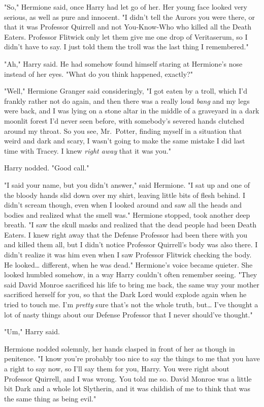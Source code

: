 "So," Hermione said, once Harry had let go of her. Her young face looked very
serious, as well as pure and innocent. "I didn't tell the Aurors you were
there, or that it was Professor Quirrell and not You-Know-Who who killed all
the Death Eaters. Professor Flitwick only let them give me one drop of
Veritaserum, so I didn't have to say. I just told them the troll was the last
thing I remembered."

"Ah," Harry said. He had somehow found himself staring at Hermione's nose
instead of her eyes. "What do you think happened, exactly?"

"Well," Hermione Granger said consideringly, "I got eaten by a troll, which I'd
frankly rather not do again, and then there was a really loud \emph{bang} and
my legs were back, and I was lying on a stone altar in the middle of a
graveyard in a dark moonlit forest I'd never seen before, with somebody's
severed hands clutched around my throat. So you see, Mr.~Potter, finding myself
in a situation that weird and dark and scary, I wasn't going to make the same
mistake I did last time with Tracey. I knew \emph{right away} that it was you."

Harry nodded. "Good call."

"I said your name, but you didn't answer," said Hermione. "I sat up and one of
the bloody hands slid down over my shirt, leaving little bits of flesh behind.
I didn't scream though, even when I looked around and saw all the heads and
bodies and realized what the smell was." Hermione stopped, took another deep
breath. "I saw the skull masks and realized that the dead people had been Death
Eaters. I knew right away that the Defense Professor had been there with you
and killed them all, but I didn't notice Professor Quirrell's body was also
there. I didn't realize it was him even when I saw Professor Flitwick checking
the body. He looked{\ldots} different, when he was dead." Hermione's voice
became quieter. She looked humbled somehow, in a way Harry couldn't often
remember seeing. "They said David Monroe sacrificed his life to bring me back,
the same way your mother sacrificed herself for you, so that the Dark Lord
would explode again when he tried to touch me. I'm \emph{pretty} sure that's
not the whole truth, but{\ldots} I've thought a lot of nasty things about our
Defense Professor that I never should've thought."

"Um," Harry said.

Hermione nodded solemnly, her hands clasped in front of her as though in
penitence. "I know you're probably too nice to say the things to me that you
have a right to say now, so I'll say them for you, Harry. You were right about
Professor Quirrell, and I was wrong. You told me so. David Monroe was a little
bit Dark and a whole lot Slytherin, and it was childish of me to think that was
the same thing as being evil."

